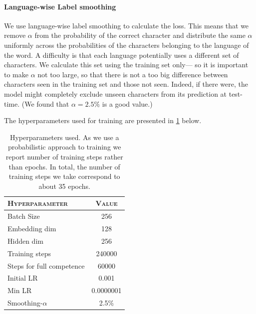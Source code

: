 \documentclass[11pt,a4paper]{article}
\begin{document}
\paragraph{Language-wise Label smoothing} We use language-wise label
smoothing to calculate the loss. This means that we remove $\alpha$
from the probability of the correct character and distribute the same
$\alpha$ uniformly across the probabilities of the characters
belonging to the language of the word. A difficulty is that each
language potentially uses a different set of characters. We calculate
this set using the training set only--- so it is important to make
$\alpha$ not too large, so that there is not a too big difference
between characters seen in the training set and those not seen.
Indeed, if there were, the model might completely exclude unseen
characters from its prediction at test-time. (We found that
\(\alpha=2.5\%\) is a good value.)


The hyperparameters used for training are presented in \cref{tab:hp} below.
\begin{table}[h]	
\centering
\begin{tabular}{lc}
\textsc{Hyperparameter} & \textsc{Value} \\
  \hline
  Batch Size & 256 \\
  Embedding dim & 128 \\
  Hidden dim & 256 \\
  Training steps & 240000 \\
  Steps for full competence & 60000 \\
  Initial LR & 0.001 \\
  Min LR & 0.0000001 \\
  Smoothing-$\alpha$ & 2.5\% \\
\end{tabular} 
\caption{Hyperparameters used. As we use a probabilistic approach to training we report number of training steps rather than epochs. In total, the number of training steps we take correspond to about 35 epochs.}
\label{tab:hp}
\end{table}
\end{document}
